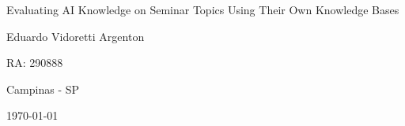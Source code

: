 \begin{titlepage}
\begin{center}
\vfill




{\fontsize{36}{\baselineskip}\selectfont
Evaluating AI Knowledge on Seminar Topics Using Their Own Knowledge Bases
}

\vfill





\begin{minipage}{0.7\linewidth}
	{\onehalfspacing\fontsize{20}{\baselineskip}\selectfont
	
    Eduardo Vidoretti Argenton
    
    
    }
\end{minipage}
\begin{minipage}{0.25\linewidth}
	{\onehalfspacing\fontsize{20}{\baselineskip}\selectfont
	RA: 290888
	
	
	}
\end{minipage}

\vfill





{\fontsize{14}{\baselineskip}\selectfont
	Campinas - SP

	\today
}

\end{center}
\end{titlepage}
